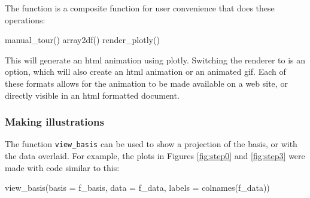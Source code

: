 \begin{Schunk}
\end{Schunk}

\noindent The  function is a composite
function for user convenience that does these operations:

\begin{Schunk}
\begin{Sinput}
manual_tour()
array2df()
render_plotly()
\end{Sinput}
\end{Schunk}

\noindent This will generate an html animation using plotly. Switching
the renderer to  is an option, which will also create an
html animation or an animated gif. Each of these formats allows for the
animation to be made available on a web site, or directly visible in an
html formatted document.

\hypertarget{making-illustrations}{%
\subsubsection{Making illustrations}\label{making-illustrations}}

The function \texttt{view\_basis} can be used to show a projection of
the basis, or with the data overlaid. For example, the plots in Figures
\ref{fig:step0} and \ref{fig:step3} were made with code similar to this:

\begin{Schunk}
\begin{Sinput}
view_basis(basis = f_basis, 
           data = f_data,
           labels = colnames(f_data))
\end{Sinput}
\end{Schunk}

